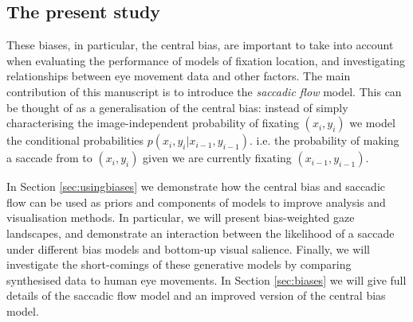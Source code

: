\subsection{The present study}

These biases, in particular, the central bias, are important to take into account when evaluating the performance of models of fixation location, and investigating relationships between eye movement data and other factors. The main contribution of this manuscript is to introduce the \textit{saccadic flow} model. This can be thought of as a generalisation of the central bias: instead of simply characterising the image-independent probability of fixating $(x_i, y_i)$ we model the conditional probabilities $p(x_i,y_i|x_{i-1}, y_{i-1})$. i.e. the probability of making a saccade from to $(x_i,y_i)$ given we are currently fixating $(x_{i-1}, y_{i-1})$.

In Section \ref{sec:usingbiases} we demonstrate how the central bias and saccadic flow can be used as priors and components of models to improve analysis and visualisation methods. In particular, we will present bias-weighted gaze landscapes, and demonstrate an interaction between the likelihood of a saccade under different bias models and bottom-up visual salience. Finally, we will investigate the short-comings of these generative models by comparing synthesised data to human eye movements. In Section \ref{sec:biases} we will give full details of the saccadic flow model and an improved version of the central bias model. 
